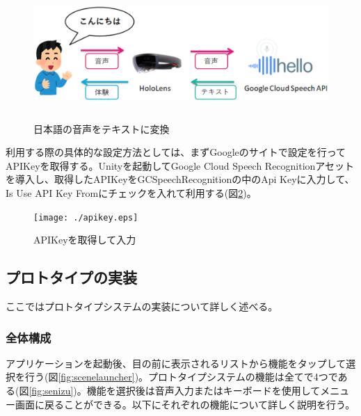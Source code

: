 \documentclass[11pt,a4j, titlepage]{jarticle} %
\begin{document}
\begin{figure}[H]
  \begin{center}
    \includegraphics[clip,height=5.0cm,width=14.0cm]{./googlespeech.eps}
    \caption{日本語の音声をテキストに変換}
    \label{fig:googlespeech}
  \end{center}
\end{figure}

利用する際の具体的な設定方法としては、まずGoogleのサイトで設定を行ってAPIKeyを取得する\cite{googlesetting}。Unityを起動してGoogle Cloud Speech Recognitionアセット\cite{speechrecognition}を導入し、取得したAPIKeyをGCSpeechRecognitionの中のApi Keyに入力して、Is Use API Key Fromにチェックを入れて利用する(図\ref{fig:apikey})。

\begin{figure}[H]
  \begin{center}
    \texttt{[image: ./apikey.eps]}
    \caption{APIKeyを取得して入力}
    \label{fig:apikey}
  \end{center}
\end{figure}

\subsection{プロトタイプの実装}
ここではプロトタイプシステムの実装について詳しく述べる。

\subsubsection{全体構成}
アプリケーションを起動後、目の前に表示されるリストから機能をタップして選択を行う(図\ref{fig:scenelauncher})。プロトタイプシステムの機能は全てで4つである(図\ref{fig:senizu})。機能を選択後は音声入力またはキーボードを使用してメニュー画面に戻ることができる。以下にそれぞれの機能について詳しく説明を行う。
\end{document}
